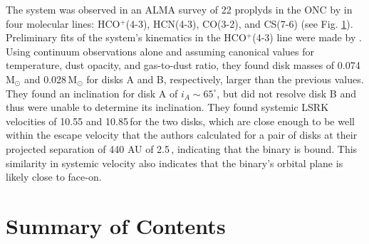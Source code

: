 \begin{figure}[htp]
  \hspace*{\fill}%
  \hfill%
  \vfill%
  \hfill%
  \hfill%
  \hspace*{\fill}%
  \label{fig:m1map}
\end{figure}

The system was observed in an ALMA survey of 22 proplyds in the ONC by \citet{Mann2014} in four molecular lines: HCO$^+$(4-3), HCN(4-3), CO(3-2), and CS(7-6) (see Fig. \ref{fig:m1map}). Preliminary fits of the system's kinematics in the HCO$^+$(4-3) line were made by \citet{Williams2014}. Using continuum observations alone and assuming canonical values for temperature, dust opacity, and gas-to-dust ratio, they found disk masses of 0.074\,M$_{\odot}$ and 0.028\,M$_{\odot}$ for disks A and B, respectively, larger than the previous values. They found an inclination for disk A of $i_A \sim 65^\circ$, but did not resolve disk B and thus were unable to determine its inclination. They found systemic LSRK velocities of 10.55 and 10.85\,\kms for the two disks, which are close enough to be well within the escape velocity that the authors calculated for a pair of disks at their projected separation of 440 AU of 2.5\,\kms, indicating that the binary is bound. This similarity in systemic velocity also indicates that the binary's orbital plane is likely close to face-on.



\section{Summary of Contents}

